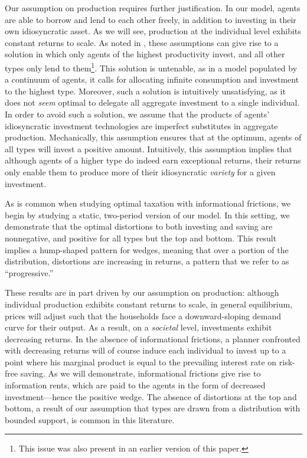 \documentclass[11pt]{article}
\begin{document}
Our assumption on production requires further justification. In our model, agents are able to borrow and lend to each other freely, in addition to investing in their own idiosyncratic asset. As we will see, production at the individual level exhibits constant returns to scale. As noted in \cite{shourideh2014optimal}, these assumptions can give rise to a solution in which only agents of the highest productivity invest, and all other types only lend to them\footnote{This issue was also present in an earlier version of this paper.}. This solution is untenable, as in a model populated by a continuum of agents, it calls for allocating infinite consumption and investment to the highest type. Moreover, such a solution is intuitively unsatisfying, as it does not \textit{seem} optimal to delegate all aggregate investment to a single individual. In order to avoid such a solution, we assume that the products of agents' idiosyncratic investment technologies are imperfect substitutes in aggregate production. Mechanically, this assumption ensures that at the optimum, agents of all types will invest a positive amount. Intuitively, this assumption implies that although agents of a higher type do indeed earn exceptional returns, their returns only enable them to produce more of their idiosyncratic \textit{variety} for a given investment. 

As is common when studying optimal taxation with informational frictions, we begin by studying a static, two-period version of our model. In this setting, we demonstrate that the optimal distortions to both investing and saving are nonnegative, and positive for all types but the top and bottom. This result implies a hump-shaped pattern for wedges, meaning that over a portion of the distribution, distortions are increasing in returns, a pattern that we refer to as ``progressive.'' 

These results are in part driven by our assumption on production: although individual production exhibits constant returns to scale, in general equilibrium, prices will adjust such that the households face a downward-sloping demand curve for their output. As a result, on a \textit{societal} level, investments exhibit decreasing returns. In the absence of informational frictions, a planner confronted with decreasing returns will of course induce each individual to invest up to a point where his marginal product is equal to the prevailing interest rate on risk-free saving. As we will demonstrate, informational frictions give rise to information rents, which are paid to the agents in the form of decreased investment---hence the positive wedge. The absence of distortions at the top and bottom, a result of our assumption that types are drawn from a distribution with bounded support, is common in this literature. 
\end{document}
